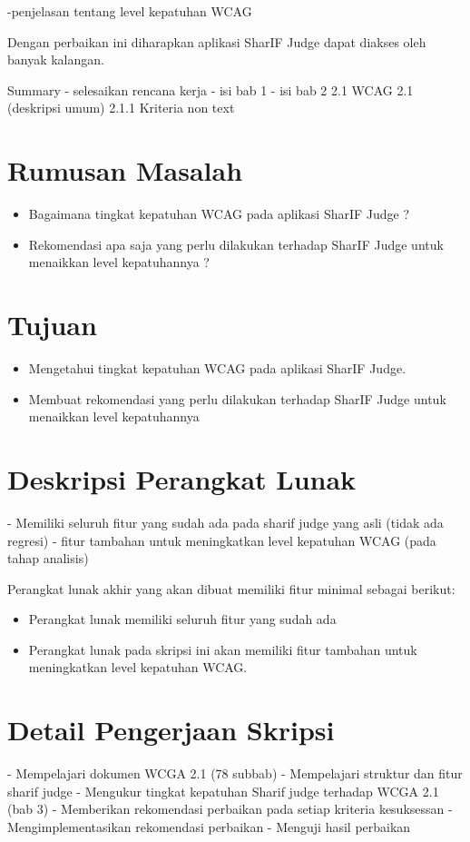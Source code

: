 \documentclass[a4paper,twoside]{article}
\begin{document}
-penjelasan tentang level kepatuhan WCAG

Dengan perbaikan ini diharapkan aplikasi SharIF Judge dapat diakses oleh banyak kalangan.

Summary
- selesaikan rencana kerja
- isi bab 1
- isi bab 2
	2.1 WCAG 2.1 (deskripsi umum) 
		2.1.1 Kriteria non text


\section{Rumusan Masalah}
\begin{itemize}
	\item Bagaimana tingkat kepatuhan WCAG pada aplikasi SharIF Judge ?
	\item Rekomendasi apa saja yang perlu dilakukan terhadap SharIF Judge untuk menaikkan level kepatuhannya ?
\end{itemize}

\section{Tujuan}
\begin{itemize}
	\item Mengetahui tingkat kepatuhan WCAG pada aplikasi SharIF Judge.
	\item Membuat rekomendasi yang perlu dilakukan terhadap SharIF Judge untuk menaikkan level kepatuhannya
\end{itemize}                         

\section{Deskripsi Perangkat Lunak}
- Memiliki seluruh fitur yang sudah ada pada sharif judge yang asli (tidak ada regresi)
- fitur tambahan untuk meningkatkan level kepatuhan WCAG (pada tahap analisis)

Perangkat lunak akhir yang akan dibuat memiliki fitur minimal sebagai berikut:
\begin{itemize}
	\item Perangkat lunak memiliki seluruh fitur yang sudah ada
	\item Perangkat lunak pada skripsi ini akan memiliki fitur tambahan untuk meningkatkan level kepatuhan WCAG.
\end{itemize}

\section{Detail Pengerjaan Skripsi}
- Mempelajari dokumen WCGA 2.1 (78 subbab)
- Mempelajari struktur dan fitur sharif judge
- Mengukur tingkat kepatuhan Sharif judge terhadap WCGA 2.1 (bab 3)
- Memberikan rekomendasi perbaikan pada setiap kriteria kesuksessan
- Mengimplementasikan rekomendasi perbaikan
- Menguji hasil perbaikan
\end{document}
